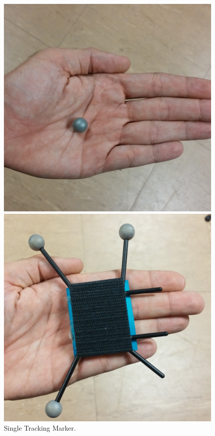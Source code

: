 \begin{figure}
  \centering
  \includegraphics[width=\linewidth]{imgs/impl/singlemarker}
    \caption{Single Tracking Marker.}
    \label{fig:singlemarker}
    \endminipage\hfill
{}
  \centering
  \includegraphics[width=\linewidth]{imgs/impl/markercombination}

\end{figure}
